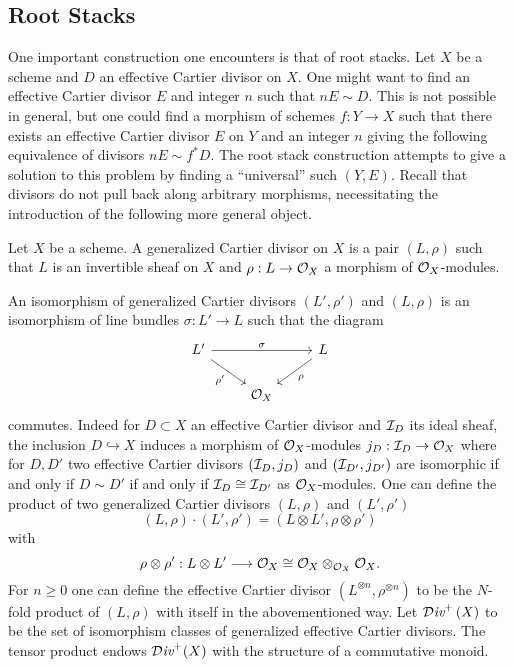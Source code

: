 \subsection{Root Stacks}\label{subsec: root stacks}
One important construction one encounters is that of root stacks. Let $X$ be a scheme and $D$ an effective Cartier divisor on $X$. One might want to find an effective Cartier divisor $E$ and integer $n$ such that $nE\sim D$. This is not possible in general, but one could find a morphism of schemes $f:Y\to X$ such that there exists an effective Cartier divisor $E$ on $Y$ and an integer $n$ giving the following equivalence of divisors $nE\sim f^{*}D$. The root stack construction attempts to give a solution to this problem by finding a ``universal'' such $(Y,E)$. Recall that divisors do not pull back along arbitrary morphisms, necessitating the introduction of the following more general object. 
\begin{definition}\label{def: generalized effective Cartier divisor}
    Let $X$ be a scheme. A generalized Cartier divisor on $X$ is a pair $(L,\rho)$ such that $L$ is an invertible sheaf on $X$ and $\rho:L\to\mathcal{O}_{X}$ a morphism of $\mathcal{O}_{X}$-modules. 
\end{definition}
An isomorphism of generalized Cartier divisors $(L',\rho')$ and $(L,\rho)$ is an isomorphism of line bundles $\sigma:L'\to L$ such that the diagram 
$$%
\begin{tikzcd}
	{L'} && L \\
	& {\Ocal_{X}}
	\arrow["\sigma", from=1-1, to=1-3]
	\arrow["{\rho'}"', from=1-1, to=2-2]
	\arrow["\rho", from=1-3, to=2-2]
\end{tikzcd}$$
commutes. Indeed for $D\subset X$ an effective Cartier divisor and $\mathcal{I}_{D}$ its ideal sheaf, the inclusion $D\hookrightarrow X$ induces a morphism of $\mathcal{O}_{X}$-modules $j_{D}:\mathcal{I}_{D}\to\mathcal{O}_{X}$ where for $D,D'$ two effective Cartier divisors $(\mathcal{I}_{D},j_{D})$ and $(\mathcal{I}_{D'},j_{D'})$ are isomorphic if and only if $D\sim D'$ if and only if $\mathcal{I}_{D}\cong\mathcal{I}_{D'}$ as $\mathcal{O}_{X}$-modules. One can define the product of two generalized Cartier divisors $(L,\rho)$ and $(L',\rho')$
$$(L,\rho)\cdot(L',\rho')=(L\otimes L', \rho\otimes\rho')$$
with 
$$\rho\otimes\rho':L\otimes L'\longrightarrow \mathcal{O}_{X}\cong\mathcal{O}_{X}\otimes_{\mathcal{O}_{X}}\mathcal{O}_{X}.$$
For $n\geq0$ one can define the effective Cartier divisor $(L^{\otimes n},\rho^{\otimes n})$ to be the $N$-fold product of $(L,\rho)$ with itself in the abovementioned way. Let $\operatorname{\mathcal{D}\emph{iv}}^{+}\left(X\right)$ to be the set of isomorphism classes of generalized effective Cartier divisors. The tensor product endows $\operatorname{\mathcal{D}\emph{iv}}^{+}(X)$ with the structure of a commutative monoid. 
